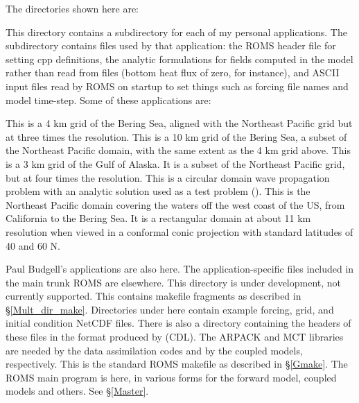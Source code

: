 The directories shown here are:
\begin{klist}
   This directory contains a subdirectory for each of my
  personal applications. The subdirectory contains files used by that
  application: the ROMS header file for setting cpp definitions, the
  analytic formulations for fields computed in the model rather than
  read from files (bottom heat flux of zero, for instance), and ASCII
  input files read by ROMS on startup to set things such as forcing file
  names and model time-step. Some of these applications are:
\begin{klist}
   This is a 4 km grid of the Bering Sea, aligned with
  the Northeast Pacific grid but at three times the resolution.
   This is a 10 km grid of the Bering Sea, a
  subset of the Northeast Pacific domain, with the same extent as
  the 4 km grid above.
   This is a 3 km grid of the Gulf of Alaska. It is a
  subset of the Northeast Pacific grid, but at four times the
  resolution.
   This is a circular domain wave propagation problem
  with an analytic solution used as a test problem (\cite{Lamb32}).
   This is the Northeast Pacific domain covering the
  waters off the west coast of the US, from California to the Bering
  Sea. It is a rectangular domain at about 11 km resolution when
  viewed in a conformal conic projection with standard latitudes of
  40 and 60 N.
\end{klist}
  Paul Budgell's applications are also here. The application-specific
  files included in the main trunk ROMS are elsewhere.
   This directory is under development, not
  currently supported.
   This contains makefile fragments as described in
  \S\ref{Mult_dir_make}.
   Directories under here contain example forcing, grid,
  and initial condition NetCDF files. There is also a directory
  containing the headers of these files in the format produced by
   (CDL).
   The ARPACK and MCT libraries are needed by the data
  assimilation codes and by the coupled models, respectively.
   This is the standard ROMS makefile as described
  in \S\ref{Gmake}.
   The ROMS main program is here, in various forms for
  the forward model, coupled models and others. See \S\ref{Master}.


\end{klist}
